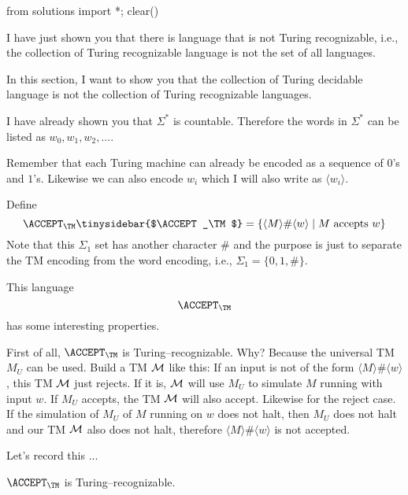 \begin{python0}
from solutions import *; clear()
\end{python0}

I have just shown you that there is language that is not
Turing recognizable, i.e., the 
collection of Turing recognizable language is not the 
set of all languages.

In this section, I want to show you
that the collection of Turing decidable language is not the 
collection of Turing recognizable languages.

I have already shown you that $\Sigma^*$ is countable.
Therefore the words in $\Sigma^*$ can be listed 
as $w_0, w_1, w_2, ...$.

Remember that each Turing machine can already be encoded as a
sequence of $0$'s and $1$'s.
Likewise we can also encode $w_i$ which I will also write
as $\langle w_i \rangle$.


Define
\[
\ACCEPT_\TM\index{accept@$\ACCEPT_\TM$}\tinysidebar{$\ACCEPT_\TM$}
= \{ \langle M \rangle \# \langle w \rangle \mid M \text{ accepts } w \}
\]
Note that this $\Sigma_1$ set has
another character $\#$ and the purpose is just to 
separate the TM encoding from the word encoding, i.e.,
$\Sigma_1 = \{0, 1, \#\}$.


This language 
\[
\ACCEPT_\TM
\]
has some interesting properties.

First of all,
$\ACCEPT_\TM$ 
is Turing--recognizable.
Why?
Because the universal TM $M_U$
can be used.
Build a TM $\cal M$
like this:
If an input is not of the form
$\langle M \rangle \# \langle w\rangle$,
this TM $\cal M$
just rejects.
If it is, $\cal M$
will use $M_U$ to simulate
$M$ running with input $w$.
If $M_U$ accepts, the TM $\cal M$ will also accept.
Likewise for the reject case.
If the simulation of $M_U$ of $M$ running on $w$
does not halt, then $M_U$ does not halt
and our TM $\cal M$ also does not halt,
therefore 
$\langle M \rangle \# \langle w\rangle$
is not accepted.

Let's record this ...

\begin{thm}
$\ACCEPT_\TM$
is Turing--recognizable.
\end{thm}

